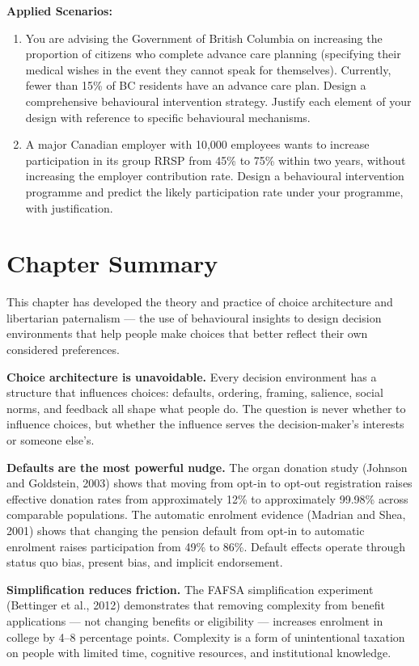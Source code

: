 \documentclass[12pt, letterpaper]{article}
\begin{document}
\textbf{Applied Scenarios:}
\begin{enumerate}
\item You are advising the Government of British Columbia on increasing the proportion of citizens who complete advance care planning (specifying their medical wishes in the event they cannot speak for themselves). Currently, fewer than 15\% of BC residents have an advance care plan. Design a comprehensive behavioural intervention strategy. Justify each element of your design with reference to specific behavioural mechanisms.
\item A major Canadian employer with 10,000 employees wants to increase participation in its group RRSP from 45\% to 75\% within two years, without increasing the employer contribution rate. Design a behavioural intervention programme and predict the likely participation rate under your programme, with justification.
\end{enumerate}

\medskip


\section*{Chapter Summary}


This chapter has developed the theory and practice of choice architecture and libertarian paternalism --- the use of behavioural insights to design decision environments that help people make choices that better reflect their own considered preferences.

\textbf{Choice architecture is unavoidable.} Every decision environment has a structure that influences choices: defaults, ordering, framing, salience, social norms, and feedback all shape what people do. The question is never whether to influence choices, but whether the influence serves the decision-maker's interests or someone else's.

\textbf{Defaults are the most powerful nudge.} The organ donation study (Johnson and Goldstein, 2003) shows that moving from opt-in to opt-out registration raises effective donation rates from approximately 12\% to approximately 99.98\% across comparable populations. The automatic enrolment evidence (Madrian and Shea, 2001) shows that changing the pension default from opt-in to automatic enrolment raises participation from 49\% to 86\%. Default effects operate through status quo bias, present bias, and implicit endorsement.

\textbf{Simplification reduces friction.} The FAFSA simplification experiment (Bettinger et al., 2012) demonstrates that removing complexity from benefit applications --- not changing benefits or eligibility --- increases enrolment in college by 4--8 percentage points. Complexity is a form of unintentional taxation on people with limited time, cognitive resources, and institutional knowledge.
\end{document}
